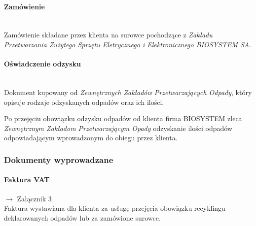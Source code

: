 	\paragraph{Zamówienie} \ \\
	Zamówienie składane przez klienta na surowce pochodzące z \emph{Zakładu Przetwarzania Zużytego Sprzętu Eletrycznego i Elektronicznego BIOSYSTEM SA}.

	\paragraph{Oświadczenie odzysku} \ \\
	Dokument kupowany od \emph{Zewnętrznych Zakładów Przetwarzających Odpady}, który opisuje rodzaje odzyskanych odpadów oraz ich ilości.

	Po przejęciu obowiązku odzysku odpadów od klienta firma BIOSYSTEM zleca \emph{Zewnętrznym Zakładom Przetwarzającym Opady} odzyskanie ilości odpadów odpowiadającym wprowadzonym do obiegu przez klienta.

\subsubsection{Dokumenty wyprowadzane}
	\paragraph{Faktura VAT} $\rightarrow$ Załącznik 3 \\
	Faktura wystawiana dla klienta za usługę przejęcia obowiązku recyklingu deklarowanych odpadów lub za zamówione surowce.
